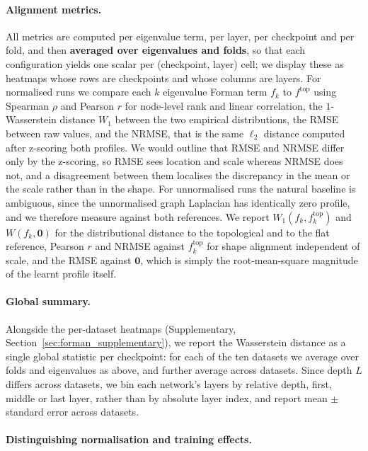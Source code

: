 \paragraph{Alignment metrics.}
All metrics are computed per eigenvalue term, per layer, per checkpoint and per fold,
and then \textbf{averaged over eigenvalues and folds}, so that each configuration yields one
scalar per (checkpoint, layer) cell; we display these as heatmaps whose rows are
checkpoints and whose columns are layers.
For normalised runs we compare each
$k$ eigenvalue Forman term $f_k$ to $f^{\mathrm{top}}$ using Spearman $\rho$ and Pearson $r$ for
node-level rank and linear correlation, the $1$-Wasserstein distance $W_1$
between the two empirical distributions, the RMSE between raw values, and the
NRMSE, that is the same $\ell_2$ distance computed after z-scoring both
profiles.
We would outline that RMSE and NRMSE differ only by
the z-scoring, so RMSE sees location and scale whereas NRMSE does not, and a
disagreement between them localises the discrepancy in the mean or the scale
rather than in the shape.
For unnormalised runs the natural baseline is ambiguous, since the unnormalised
graph Laplacian has identically zero profile, and we therefore measure against
both references. We report $W_1(f_k, f_k^{\mathrm{top}})$ and $W(f_k,\mathbf{0})$
for the distributional distance to the topological and to the flat reference,
Pearson $r$ and NRMSE against $f_k^{\mathrm{top}}$ for shape alignment
independent of scale, and the RMSE against $\mathbf{0}$, which is simply the
root-mean-square magnitude of the learnt profile itself.

\paragraph{Global summary.}
Alongside the per-dataset heatmaps (Supplementary, Section~\ref{sec:forman_supplementary}), we report the Wasserstein distance as a single global statistic per checkpoint: for each of the ten datasets we average over folds and eigenvalues as above, and further average across datasets. Since depth $L$ differs across datasets, we bin each network's layers by relative depth, first, middle or last layer, rather than by absolute layer index, and report mean $\pm$ standard error across datasets.

\paragraph{Distinguishing normalisation and training effects.}

